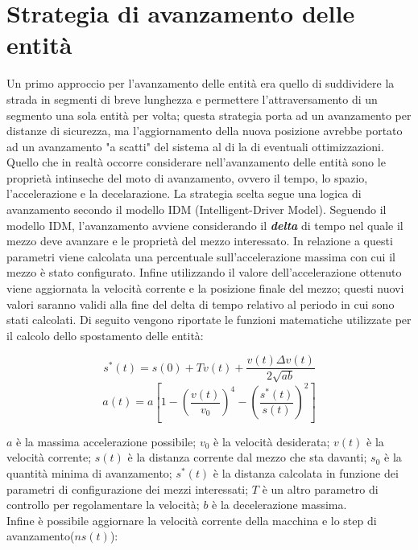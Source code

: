 \section{Strategia di avanzamento delle entità}
Un primo approccio per l'avanzamento delle entità era quello di suddividere la strada in segmenti di breve lunghezza e permettere l'attraversamento di un segmento una sola entità per volta; questa strategia porta ad un avanzamento per distanze di sicurezza, ma l'aggiornamento della nuova posizione avrebbe portato ad un avanzamento "a scatti" del sistema al di la di eventuali ottimizzazioni. \\
Quello che in realtà occorre considerare nell'avanzamento delle entità sono le proprietà intinseche del moto di avanzamento, ovvero il tempo, lo spazio, l'accelerazione  e la decelarazione. La strategia scelta segue una logica di avanzamento secondo il modello IDM (Intelligent-Driver Model).
Seguendo il modello IDM, l'avanzamento avviene considerando il \textbf{\textit{delta}} di tempo nel quale il mezzo deve avanzare e le proprietà del mezzo interessato. In relazione a questi parametri viene calcolata una percentuale sull'accelerazione massima con cui il mezzo è stato configurato. Infine utilizzando il valore dell'accelerazione ottenuto viene aggiornata la velocità corrente e la posizione finale del mezzo; questi nuovi valori saranno validi alla fine del delta di tempo relativo al periodo in cui sono stati calcolati. Di seguito vengono riportate le funzioni matematiche utilizzate per il calcolo dello spostamento delle entità:

\begin{equation}
s^{*}(t)=s(0)+Tv(t)+\frac{v(t)\Delta{v(t)}}{2\sqrt{ab}}
\end{equation}
\begin{equation}
a(t)=a[1-(\frac{v(t)}{v_{0}})^4-(\frac{s^{*}(t)}{s(t)})^2]
\end{equation}

$a$ è la massima accelerazione possibile; $v_{0}$ è la velocità desiderata; $v(t)$ è la velocità corrente; $s(t)$ è la distanza corrente dal mezzo che sta davanti; $s_{0}$ è la quantità minima di avanzamento; $s^*(t)$ è la distanza calcolata in funzione dei parametri di configurazione dei mezzi interessati; $T$ è un altro parametro di controllo per regolamentare la velocità; $b$ è la decelerazione massima.\\
Infine è possibile aggiornare la velocità corrente della macchina e lo step di avanzamento($ns(t)$): \\

